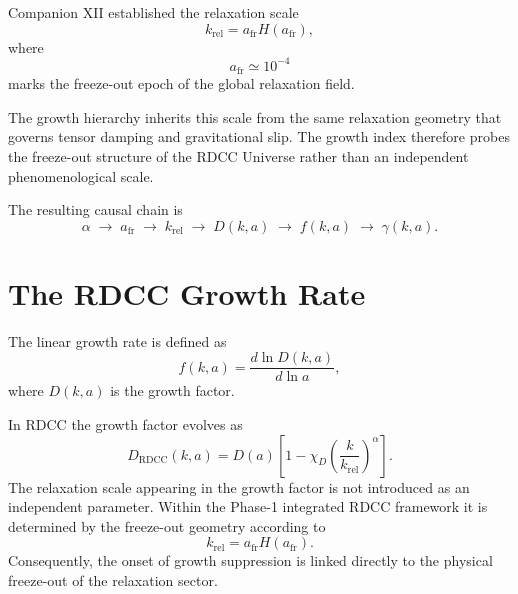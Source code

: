 \documentclass[11pt,a4paper]{article}
\begin{document}
Companion XII established the relaxation scale
\begin{equation}
  k_{\mathrm{rel}}
  =
  a_{\mathrm{fr}} H(a_{\mathrm{fr}}),
\end{equation}
where
\begin{equation}
  a_{\mathrm{fr}}
  \simeq
  10^{-4}
\end{equation}
marks the freeze-out epoch of the global relaxation field.

The growth hierarchy inherits this scale from the same relaxation geometry that
governs tensor damping and gravitational slip. The growth index therefore
probes the freeze-out structure of the RDCC Universe rather than an independent
phenomenological scale.

The resulting causal chain is
\begin{equation}
  \alpha
  \;\rightarrow\;
  a_{\mathrm{fr}}
  \;\rightarrow\;
  k_{\mathrm{rel}}
  \;\rightarrow\;
  D(k,a)
  \;\rightarrow\;
  f(k,a)
  \;\rightarrow\;
  \gamma(k,a).
\end{equation}

\section{The RDCC Growth Rate}

The linear growth rate is defined as
\begin{equation}
  f(k,a)
  =
  \frac{d\ln D(k,a)}{d\ln a},
\end{equation}
where \(D(k,a)\) is the growth factor.

In RDCC the growth factor evolves as
\begin{equation}
  D_{\mathrm{RDCC}}(k,a)
  =
  D(a)
  \left[
    1
    -
    \chi_{D}
    \left(
      \frac{k}{k_{\mathrm{rel}}}
    \right)^{\alpha}
  \right].
\end{equation}
The relaxation scale appearing in the growth factor is not introduced as an
independent parameter. Within the Phase-1 integrated RDCC framework it is
determined by the freeze-out geometry according to
\begin{equation}
  k_{\mathrm{rel}}
  =
  a_{\mathrm{fr}} H(a_{\mathrm{fr}}).
\end{equation}
Consequently, the onset of growth suppression is linked directly to the
physical freeze-out of the relaxation sector.
\end{document}
